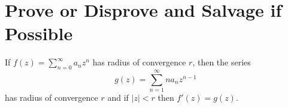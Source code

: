 \documentclass{homework}
\begin{document}
                                                                                                                      \section{Prove or Disprove and Salvage if Possible}

                                                                                                                      \begin{problem}\label{differentiating-taylor-series}If
                                                                                                                        $f(z) = \sum_{n=0}^\infty a_n z^n$ has radius of convergence $r$,
                                                                                                                          then the series
                                                                                                                            \[
                                                                                                                                g(z) = \sum_{n=1}^\infty n a_n z^{n-1} 
                                                                                                                                  \]
                                                                                                                                    has radius of convergence $r$ and if $|z| < r$ then $f'(z) = g(z)$.
                                                                                                                                    \end{problem}
\end{document}
